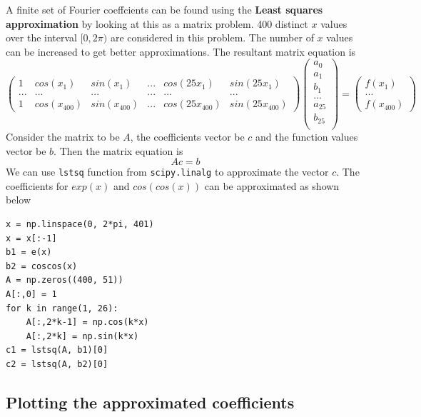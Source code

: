 \documentclass[12pt, a4paper]{article}
\begin{document}
A finite set of Fourier coeffcients can be found using the \textbf{Least squares approximation} by looking at this as a matrix problem. 400 distinct $x$ values over the interval $[0, 2\pi)$ are considered in this problem. The number of $x$ values can be increased to get better approximations. The resultant matrix equation is
\begin{equation*}
\begin{pmatrix}
1 & cos(x_1) & sin(x_1) & ... & cos(25x_1) & sin(25x_1) \\
... & ... & ... & ... & ... & ... \\
1 & cos(x_{400}) & sin(x_{400}) & ... & cos(25x_{400}) & sin(25x_{400})
\end{pmatrix}
\begin{pmatrix}
a_0 \\
a_1 \\
b_1 \\
... \\
a_{25} \\
b_{25} \\
\end{pmatrix} = 
\begin{pmatrix}
f(x_1) \\
... \\
f(x_{400})
\end{pmatrix}
\end{equation*}
Consider the matrix to be $A$, the coefficients vector be $c$ and the function values vector be $b$. Then the matrix equation is
\begin{equation*}
Ac = b
\end{equation*}
We can use \texttt{lstsq} function from \texttt{scipy.linalg} to approximate the vector $c$. The coefficients for $exp(x)$ and $cos(cos(x))$ can be approximated as shown below
\begin{lstlisting}
x = np.linspace(0, 2*pi, 401)
x = x[:-1]
b1 = e(x)
b2 = coscos(x)
A = np.zeros((400, 51))
A[:,0] = 1
for k in range(1, 26):
    A[:,2*k-1] = np.cos(k*x)
    A[:,2*k] = np.sin(k*x)
c1 = lstsq(A, b1)[0]
c2 = lstsq(A, b2)[0]
\end{lstlisting}

\subsection{Plotting the approximated coefficients}
\end{document}
